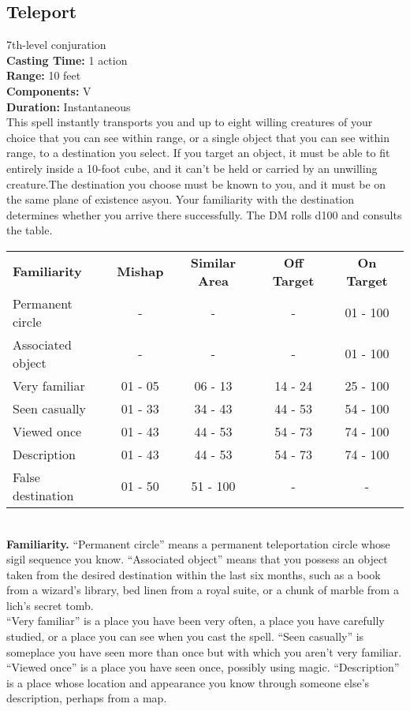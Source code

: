 \documentclass[11pt, A4paper, english]{article}
\begin{document}
		\subsection{Teleport}
7th-level conjuration \\
\textbf{Casting Time:} 1 action \\
\textbf{Range:} 10 feet \\
\textbf{Components:} V \\
\textbf{Duration:} Instantaneous \\
This spell instantly transports you and up to eight willing creatures of your choice that you can see within range, or a single object that you can see within range, to a destination you select. If you target an object, it must be able to fit entirely inside a  10-foot cube, and it can’t be held or carried by an unwilling creature.The destination you choose must be known to you, and it must be on the same plane of existence asyou. Your familiarity with the destination determines whether you arrive there successfully. The DM rolls d100 and consults the table. \\
			\begin{tabular}{lcccc}
\textbf{Familiarity} & \textbf{Mishap} & \textbf{Similar Area} & \textbf{Off Target} & \textbf{On Target} \\
Permanent circle & - & - & - & 01 - 100 \\
Associated object & - & - & - & 01 - 100 \\
Very familiar & 01 - 05 & 06 - 13 & 14 - 24 & 25 - 100 \\
Seen casually & 01 - 33 & 34 - 43 & 44 - 53 & 54 - 100 \\
Viewed once & 01 - 43 & 44 - 53 & 54 - 73 & 74 - 100 \\
Description & 01 - 43 & 44 - 53 & 54 - 73 & 74 - 100 \\
False destination & 01 - 50 & 51 - 100 & - & -
			\end{tabular} \\
\textbf{Familiarity.} “Permanent circle” means a permanent teleportation circle whose sigil sequence you know. “Associated object” means that you possess an object taken from the desired destination within the last six months, such as a book from a wizard's library, bed linen from a royal suite, or a chunk of marble from a lich’s secret tomb. \\
“Very familiar” is a place you have been very often, a place you have carefully studied, or a place you can see when you cast the spell. “Seen casually” is someplace you have seen more than once but with which you aren’t very familiar. “Viewed once” is a place you have seen once, possibly using magic. “Description” is a place whose location and appearance you know through someone else’s description, perhaps from a map. \\
\end{document}
